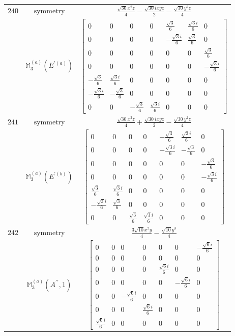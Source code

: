 \documentclass[fleqn,8pt,landscape]{jsarticle}
\begin{document}
\begin{longtable}{ccc}
$ 240 $ & $ \text{symmetry} $ & $ \frac{\sqrt{30} x^{2} z}{4} - \frac{\sqrt{30} i x y z}{2} - \frac{\sqrt{30} y^{2} z}{4} $ \\
$  $ & $ \mathbb{M}_{3}^{(a)}(E^{\prime(a)}) $ & $ \begin{bmatrix} 0 & 0 & 0 & 0 & \frac{\sqrt{3}}{6} & \frac{\sqrt{3} i}{6} & 0 \\ 0 & 0 & 0 & 0 & - \frac{\sqrt{3} i}{6} & \frac{\sqrt{3}}{6} & 0 \\ 0 & 0 & 0 & 0 & 0 & 0 & \frac{\sqrt{3}}{6} \\ 0 & 0 & 0 & 0 & 0 & 0 & - \frac{\sqrt{3} i}{6} \\ - \frac{\sqrt{3}}{6} & \frac{\sqrt{3} i}{6} & 0 & 0 & 0 & 0 & 0 \\ - \frac{\sqrt{3} i}{6} & - \frac{\sqrt{3}}{6} & 0 & 0 & 0 & 0 & 0 \\ 0 & 0 & - \frac{\sqrt{3}}{6} & \frac{\sqrt{3} i}{6} & 0 & 0 & 0 \end{bmatrix} $ \\ \hline
$ 241 $ & $ \text{symmetry} $ & $ \frac{\sqrt{30} x^{2} z}{4} + \frac{\sqrt{30} i x y z}{2} - \frac{\sqrt{30} y^{2} z}{4} $ \\
$  $ & $ \mathbb{M}_{3}^{(a)}(E^{\prime(b)}) $ & $ \begin{bmatrix} 0 & 0 & 0 & 0 & - \frac{\sqrt{3}}{6} & \frac{\sqrt{3} i}{6} & 0 \\ 0 & 0 & 0 & 0 & - \frac{\sqrt{3} i}{6} & - \frac{\sqrt{3}}{6} & 0 \\ 0 & 0 & 0 & 0 & 0 & 0 & - \frac{\sqrt{3}}{6} \\ 0 & 0 & 0 & 0 & 0 & 0 & - \frac{\sqrt{3} i}{6} \\ \frac{\sqrt{3}}{6} & \frac{\sqrt{3} i}{6} & 0 & 0 & 0 & 0 & 0 \\ - \frac{\sqrt{3} i}{6} & \frac{\sqrt{3}}{6} & 0 & 0 & 0 & 0 & 0 \\ 0 & 0 & \frac{\sqrt{3}}{6} & \frac{\sqrt{3} i}{6} & 0 & 0 & 0 \end{bmatrix} $ \\ \hline
$ 242 $ & $ \text{symmetry} $ & $ \frac{3 \sqrt{10} x^{2} y}{4} - \frac{\sqrt{10} y^{3}}{4} $ \\
$  $ & $ \mathbb{M}_{3}^{(a)}(A^{\prime\prime},1) $ & $ \begin{bmatrix} 0 & 0 & 0 & 0 & 0 & 0 & - \frac{\sqrt{6} i}{6} \\ 0 & 0 & 0 & 0 & 0 & 0 & 0 \\ 0 & 0 & 0 & 0 & \frac{\sqrt{6} i}{6} & 0 & 0 \\ 0 & 0 & 0 & 0 & 0 & - \frac{\sqrt{6} i}{6} & 0 \\ 0 & 0 & - \frac{\sqrt{6} i}{6} & 0 & 0 & 0 & 0 \\ 0 & 0 & 0 & \frac{\sqrt{6} i}{6} & 0 & 0 & 0 \\ \frac{\sqrt{6} i}{6} & 0 & 0 & 0 & 0 & 0 & 0 \end{bmatrix} $ \\ \hline

\end{longtable}
\end{document}
